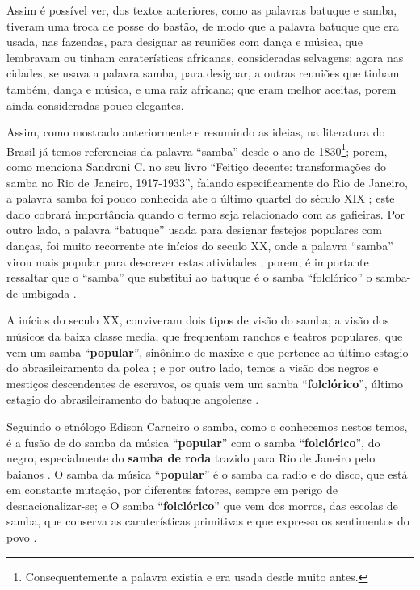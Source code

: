 Assim é possível ver, dos textos anteriores, como as palavras batuque e samba, 
tiveram uma troca de posse do bastão,
de modo que a palavra batuque que era usada, nas fazendas, 
para designar as reuniões com dança e música,
que lembravam ou tinham caraterísticas africanas, consideradas selvagens;
agora nas cidades, se usava a palavra samba, para designar,
a outras reuniões que tinham também, dança e música, 
e uma raiz africana; que eram melhor aceitas, porem ainda consideradas pouco elegantes. 



\PRLsep{*}


Assim, como mostrado anteriormente e resumindo as ideias, 
na literatura do Brasil já temos referencias da palavra ``samba'' desde o ano de 1830\footnote{
Consequentemente a palavra existia e era usada desde muito antes.}; 
porem, como menciona Sandroni C. no seu livro ``Feitiço decente: transformações do samba no Rio de Janeiro, 1917-1933'', 
falando especificamente do Rio de Janeiro, 
a palavra samba foi pouco conhecida ate o último quartel do século XIX \cite[pp. 86]{sandroni2001feitico};
este dado cobrará importância quando o termo seja relacionado com as gafieiras.
Por outro lado, a palavra  ``batuque'' usada para designar festejos populares com danças, 
foi muito recorrente ate inícios do seculo XX, 
onde a palavra ``samba'' virou mais popular para descrever estas atividades \cite[pp. 85]{sandroni2001feitico} \cite[pp. 47]{diniz2008almanaque}; porem,
é importante ressaltar que o ``samba'' que substitui ao batuque 
é o samba ``folclórico'' o samba-de-umbigada  \cite[pp. 96]{sandroni2001feitico}.

A inícios do seculo XX, 
conviveram dois tipos de visão do samba;
a visão dos músicos da baixa classe media, que frequentam ranchos e teatros populares, 
que vem um samba ``\textbf{popular}'', 
sinônimo de maxixe e que pertence ao último estagio 
do abrasileiramento da polca  \cite[pp. 139]{sandroni2001feitico}; e
por outro lado, temos a visão dos negros e mestiços descendentes de escravos,
os quais vem um samba ``\textbf{folclórico}'', 
último estagio do abrasileiramento do batuque angolense \cite[pp. 139]{sandroni2001feitico}.

Seguindo o etnólogo Edison Carneiro o samba, como o conhecemos nestos temos,
é a fusão de do samba da música ``\textbf{popular}'' com o samba  ``\textbf{folclórico}'', 
do negro, especialmente do \textbf{samba de roda} trazido para Rio de Janeiro pelo baianos \cite[pp. 21]{jornalsambaderoda1}.
O samba da música ``\textbf{popular}'' é o samba da radio e do disco, que está em constante mutação,
por diferentes fatores, sempre em perigo de desnacionalizar-se; e O samba   ``\textbf{folclórico}''
que vem dos morros, das escolas de samba, que conserva as caraterísticas primitivas e
que expressa os sentimentos do povo \cite[pp. 21]{jornalsambaderoda1}.


